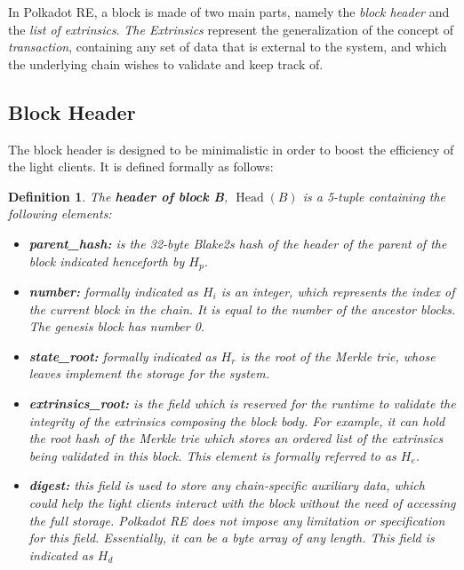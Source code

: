 \documentclass{article}
\newcommand{\tmem}[1]{{\em #1\/}}
\newcommand{\tmop}[1]{\ensuremath{\operatorname{#1}}}
\newcommand{\tmsamp}[1]{\textsf{#1}}
\newcommand{\tmstrong}[1]{\textbf{#1}}
\newcommand{\tmtextbf}[1]{{\bfseries{#1}}}
\newcommand{\tmtextit}[1]{{\itshape{#1}}}
\newcommand{\tmtextsf}[1]{{\sffamily{#1}}}
\newtheorem{definition}{Definition}
\providecommand{\tmem}[1]{\tmtextit{#1}}
\providecommand{\tmop}[1]{\ensuremath{\mathrm{#1}}}
\providecommand{\tmsamp}[1]{\tmtextsf{#1}}
\providecommand{\tmstrong}[1]{\tmtextbf{#1}}
\providecommand{\tmtextbf}[1]{\tmtextbf{#1}}
\providecommand{\tmtextit}[1]{\tmtextit{#1}}
\newtheorem{definition}{Definition}
\begin{document}
In Polkadot RE, a block is made of two main parts, namely the \tmtextit{block
header} and the \tmtextit{list of extrinsics}. {\tmem{The Extrinsics}}
represent the generalization of the concept of {\tmem{transaction}},
containing any set of data that is external to the system, and which the
underlying chain wishes to validate and keep track of.

\subsection{Block Header}\label{block}

The block header is designed to be minimalistic in order to boost the
efficiency of the light clients. It is defined formally as follows:

\begin{definition}
  \label{def-block-header}The {\tmstrong{header of block B}},
  {\tmstrong{$\tmop{Head} (B)$}} is a 5-tuple containing the following
  elements:
  \begin{itemize}
    \item \tmtextbf{{\tmsamp{parent\_hash:}}} is the 32-byte Blake2s hash of
    the header of the parent of the block indicated henceforth by
    \tmtextbf{$H_p$}.
    
    \item {\tmstrong{{\tmsamp{number:}}}} formally indicated as
    {\tmstrong{$H_i$}} is an integer, which represents the index of the
    current block in the chain. It is equal to the number of the ancestor
    blocks. The genesis block has number 0.
    
    \item {\tmstrong{{\tmsamp{state\_root:}}}} formally indicated as
    {\tmstrong{$H_r$}} is the root of the Merkle trie, whose leaves implement
    the storage for the system.
    
    \item {\tmstrong{{\tmsamp{extrinsics\_root:}}}} is the field which is
    reserved for the runtime to validate the integrity of the extrinsics
    composing the block body. For example, it can hold the root hash of the
    Merkle trie which stores an ordered list of the extrinsics being validated
    in this block. This element is formally referred to as {\tmstrong{$H_e$}}.
    
    \item {\tmstrong{{\tmsamp{digest:}}}} this field is used to store any
    chain-specific auxiliary data, which could help the light clients interact
    with the block without the need of accessing the full storage. Polkadot RE
    does not impose any limitation or specification for this field.
    Essentially, it can be a byte array of any length. This field is indicated
    as {\tmstrong{$H_d$}}
  \end{itemize}
\end{definition}
\end{document}
